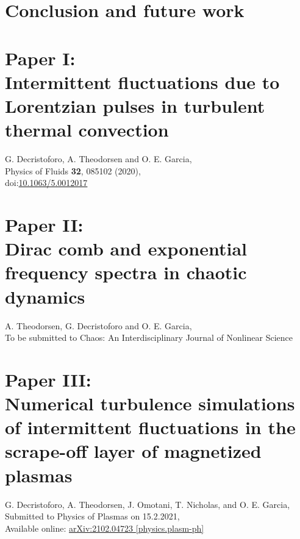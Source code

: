 \documentclass[11pt,twoside,openright]{book}
\begin{document}
  \chapter{Conclusion and future work}\label{ch:conclusion} 

  \backmatter

  



  \chapter{Paper I: \\ Intermittent fluctuations due to Lorentzian pulses in turbulent
    thermal convection}

   G. Decristoforo, A. Theodorsen and O. E. Garcia,\\ Physics of
  Fluids {\bf 32}, 085102 (2020),\\
  doi:\href{https://doi.org/10.1063/5.0012017}{10.1063/5.0012017}

  \newpage

  \null

  \newpage

  

  \chapter{Paper II: \\ Dirac comb and exponential frequency spectra in chaotic
    dynamics}  A. Theodorsen, G. Decristoforo and O. E. Garcia,\\
  To be submitted to Chaos: An Interdisciplinary Journal of Nonlinear Science

  \newpage

  \null

  \newpage

  

  \chapter{Paper III: \\ Numerical turbulence simulations of intermittent fluctuations
    in the scrape-off layer of magnetized plasmas}  G.
  Decristoforo, A. Theodorsen, J. Omotani, T. Nicholas, and O. E. Garcia,\\ Submitted to
  Physics of Plasmas on 15.2.2021,\\ Available online:
  \href{https://arxiv.org/abs/2102.04723}{arXiv:2102.04723 [physics.plasm-ph]}
\end{document}
